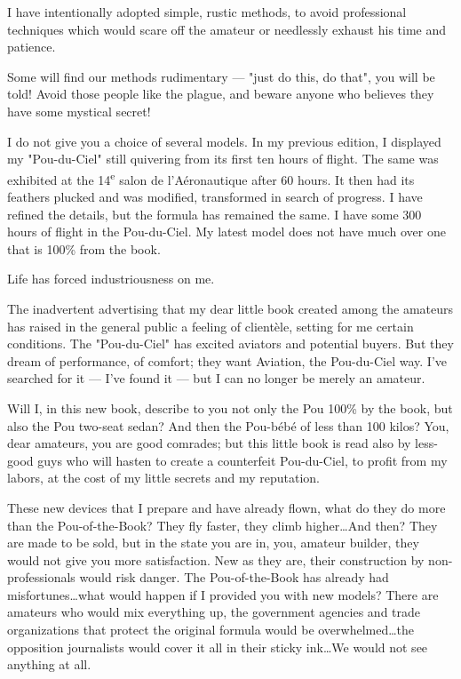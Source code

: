 \documentclass{book}
\begin{document}
I have intentionally adopted simple, rustic methods, to avoid
professional techniques which would scare off the amateur or
needlessly exhaust his time and patience.

Some will find our methods rudimentary --- "just do this, do that",
you will be told!  Avoid those people like the plague, and beware
anyone who believes they have some mystical secret!

I do not give you a choice of several models. In my previous edition,
I displayed my "Pou-du-Ciel" still quivering from its first ten hours
of flight. The same was exhibited at the 14\textsuperscript{e} salon
de l'Aéronautique after 60 hours. It then had its feathers plucked and
was modified, transformed in search of progress. I have refined the
details, but the formula has remained the same. I have some 300 hours
of flight in the Pou-du-Ciel. My latest model does not have much over
one that is 100\% from the book.

Life has forced industriousness on me.

The inadvertent advertising that my dear little book created among the
amateurs has raised in the general public a feeling of client\`ele,
setting for me certain conditions. The "Pou-du-Ciel" has excited
aviators and potential buyers. But they dream of performance, of
comfort; they want Aviation, the Pou-du-Ciel way. I've searched for it
--- I've found it --- but I can no longer be merely an amateur.

Will I, in this new book, describe to you not only the Pou 100\% by
the book, but also the Pou two-seat sedan? And then the Pou-bébé of
less than 100 kilos? You, dear amateurs, you are good comrades; but
this little book is read also by less-good guys who will hasten to
create a counterfeit Pou-du-Ciel, to profit from my labors, at the
cost of my little secrets and my reputation.

These new devices that I prepare and have already flown, what do they
do more than the Pou-of-the-Book? They fly faster, they climb
higher\ldots And then? They are made to be sold, but in the state you
are in, you, amateur builder, they would not give you more
satisfaction. New as they are, their construction by non-professionals
would risk danger. The Pou-of-the-Book has already had
misfortunes\ldots what would happen if I provided you with new models?
There are amateurs who would mix everything up, the government
agencies and trade organizations that protect the original formula
would be overwhelmed\ldots the opposition journalists would cover it
all in their sticky ink\ldots We would not see anything at all.
\end{document}

